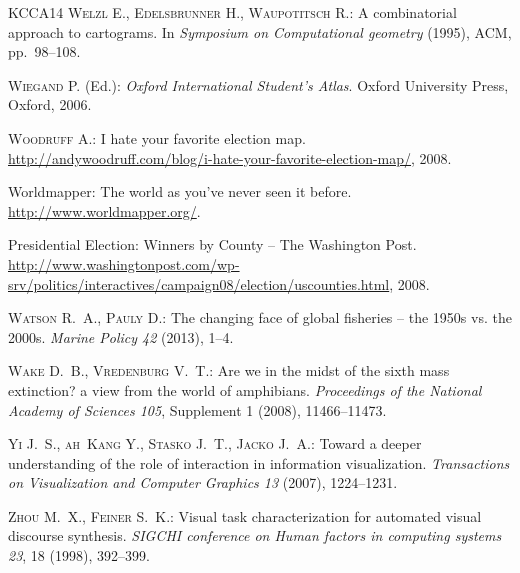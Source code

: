 \documentclass{egpubl}
\begin{document}
\begin{thebibliography}{\uppercase{KCCA{\etalchar{*}}14}}
\textsc{Welzl E., Edelsbrunner H., Waupotitsch R.}:
\newblock A combinatorial approach to cartograms.
\newblock In \emph{Symposium on Computational geometry} (1995), ACM,
  pp.~98--108.

\textsc{Wiegand P.} (Ed.):
\newblock \emph{Oxford International Student's Atlas}.
\newblock Oxford University Press, Oxford, 2006.

\textsc{Woodruff A.}:
\newblock I hate your favorite election map.
\newblock
  \url{http://andywoodruff.com/blog/i-hate-your-favorite-election-map/}, 2008.

Worldmapper: The world as you've never seen it before.
\newblock \url{http://www.worldmapper.org/}.

{Presidential Election: Winners by County -- The Washington Post}.
\newblock
  \url{http://www.washingtonpost.com/wp-srv/politics/interactives/campaign08/election/uscounties.html},
  2008.

\textsc{Watson R.~A., Pauly D.}:
\newblock The changing face of global fisheries -- the 1950s vs. the 2000s.
\newblock \emph{Marine Policy 42} (2013), 1--4.

\textsc{Wake D.~B., Vredenburg V.~T.}:
\newblock Are we in the midst of the sixth mass extinction? a view from the
  world of amphibians.
\newblock \emph{Proceedings of the National Academy of Sciences 105},
  Supplement 1 (2008), 11466--11473.

\textsc{Yi J.~S., ah~Kang Y., Stasko J.~T., Jacko J.~A.}:
\newblock Toward a deeper understanding of the role of interaction in
  information visualization.
\newblock \emph{Transactions on Visualization and Computer Graphics 13} (2007),
  1224--1231.

\textsc{Zhou M.~X., Feiner S.~K.}:
\newblock Visual task characterization for automated visual discourse
  synthesis.
\newblock \emph{SIGCHI conference on Human factors in computing systems 23}, 18
  (1998), 392--399.

\end{thebibliography}
 
\end{document}
